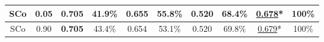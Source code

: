 \begin{table}[!t]
\begin{tabular}{|@{}c@{}|@{}c@{}||@{}c@{}|@{}c@{}||@{}c@{}|@{}c@{}||@{}c@{}|@{}c@{}||@{}c@{}||@{}c@{}|}
SCo & 0.05 & \bf{0.705} & 41.9\%
&0.655 &55.8\%
& 0.520	&68.4\%
&\underline{0.678}* & 100\%
\\
\hline SCo& 0.90 & {\bf 0.705} & 43.4\%
&0.654 & 53.1\%
&0.520	&69.8\%
&\underline{0.679}*&
100\%
\\
\hline

\end{tabular}
\end{table}



